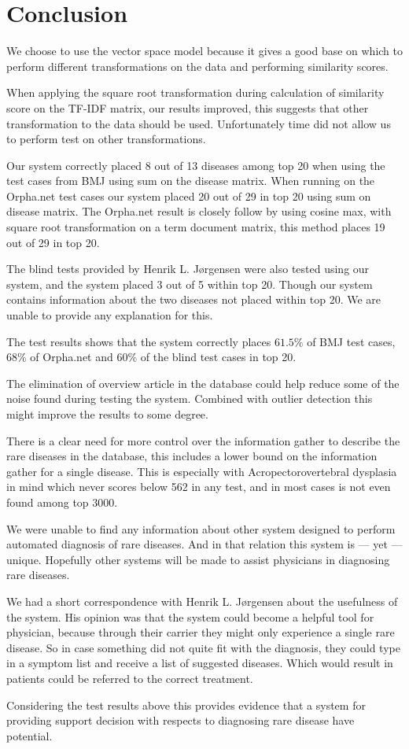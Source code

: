 \chapter{Conclusion}

We choose to use the vector space model because it gives a good base
on which to perform different transformations on the data and performing
similarity scores.

When applying the square root transformation during calculation of
similarity score on the TF-IDF matrix, our results improved, this
suggests that other transformation to the data should be
used. Unfortunately time did not allow us to perform test on other
transformations.

Our system correctly placed 8 out of 13 diseases among top 20 when
using the test cases from BMJ using sum on the disease matrix. When
running on the Orpha.net test cases our system placed 20 out of 29 in
top 20 using sum on disease matrix. The Orpha.net result is closely
follow by using cosine max, with square root transformation on a term
document matrix, this method places 19 out of 29 in top 20.

The blind tests provided by Henrik L. J\o rgensen were also tested
using our system, and the system placed 3 out of 5 within top
20. Though our system contains information about the two diseases not
placed within top 20. We are unable to provide any explanation for
this.

The test results shows that the system correctly places $61.5\%$ of
BMJ test cases, $68\%$ of Orpha.net and $60\%$ of the blind test cases
in top 20.

The elimination of overview article in the database could help reduce
some of the noise found during testing the system. Combined with
outlier detection this might improve the results to some degree.

There is a clear need for more control over the information gather to
describe the rare diseases in the database, this includes a lower
bound on the information gather for a single disease. This is
especially with Acropectorovertebral dysplasia in mind which never
scores below 562 in any test, and in most cases is not even found
among top 3000.

We were unable to find any information about other system designed to
perform automated diagnosis of rare diseases. And in that relation
this system is --- yet --- unique. Hopefully other systems will be
made to assist physicians in diagnosing rare diseases.

We had a short correspondence with Henrik L. J\o rgensen about the
usefulness of the system. His opinion was that the system could become a
helpful tool for physician, because through their carrier they might
only experience a single rare disease. So in case something did not
quite fit with the diagnosis, they could type in a symptom list and
receive a list of suggested diseases. Which would result in patients
could be referred to the correct treatment.

Considering the test results above this provides evidence that a
system for providing support decision with respects to diagnosing rare
disease have potential.
